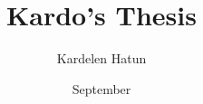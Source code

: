 \documentclass[10pt, b5paper, twoside]{memoir}
\begin{document}
 
\author{Kardelen Hatun} 
\title{Kardo's Thesis} 
\date{September} 

% 

\mainmatter 

% 
%  




\backmatter 


\end{document}
